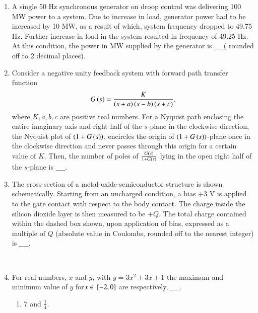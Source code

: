 \documentclass[journal]{IEEEtran}
\begin{document}
\begin{enumerate}
\begin{figure}[!ht]
\centering
\resizebox{0.7\textwidth}{!}{%

}%
\end{figure}\\
\pagebreak
\item A single 50 Hz synchronous generator on droop control was delivering 100 MW power to a system. Due to increase in load, generator power had to be increased by 10 MW, as a result of which, system frequency dropped to 49.75 Hz. Further increase in load in the system resulted in frequency of 49.25 Hz.
At this condition, the power in MW supplied by the generator is $\_\_\_\_$( rounded off to 2 decimal places). \\
\item Consider a negative unity feedback system with forward path transfer function 
\begin{align*}
    G\left(s\right) = \frac{K}{\left(s+a\right)\left(s-b\right)\left(s+c\right)},
\end{align*}
where $K, a, b, c$ are positive real numbers. For a Nyquist path enclosing the
entire imaginary axis and right half of the $s$-plane in the clockwise direction, the Nyquist plot of $\left(1 + G\left(s\right)\right)$, encircles the origin of $\left(1 + G\left(s\right)\right)$-plane once in the clockwise direction and never passes
through this origin for a certain value of $K$. Then, the number of poles of $\frac{G\left(s\right)}{1 + G\left(s\right)}$ lying in the open right half of the $s$-plane is $\_\_\_\_$. \\
\item The cross-section of a metal-oxide-semiconductor structure is shown schematically. Starting from an uncharged condition, a bias +3 V is applied to the gate contact with respect to the body contact. The charge inside the silicon dioxide layer is then measured to be $+Q$. The total charge contained within the dashed box shown, upon application of bias, expressed as a multiple of $Q$ (absolute value in Coulombs, rounded off to the nearest integer) is $\_\_\_\_$.
\begin{figure}[!ht]
\centering
\resizebox{0.7\textwidth}{!}{%

}%
\end{figure}\\
\pagebreak
\item For real numbers, $x$ and $y$, with $y = 3x^2 + 3x + 1$ the maximum and minimum value of $y$ for$x \in {}\left[-2, 0\right]$ are respectively, $\_\_\_\_$.
\begin{enumerate}
    \item 7 and $\frac{1}{4}$.

\end{enumerate}
\end{enumerate}
\end{document}
